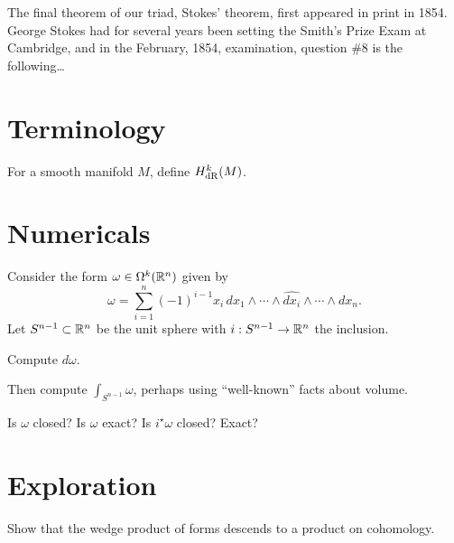 \documentclass{homework}
\author{Jim Fowler}
\begin{document}
\maketitle

\begin{inspiration} The final theorem of our triad, Stokes' theorem,
first appeared in print in 1854.  George Stokes had for several years
been setting the Smith's Prize Exam at Cambridge, and in the February,
1854, examination, question \#8 is the following\ldots {}
\end{inspiration}

\section{Terminology}

\begin{problem}
  For a smooth manifold $M$, define $H^k_{\operatorname{dR}}(M)$.
\end{problem}

\section{Numericals}

\begin{problem}
Consider the form $\omega \in \Omega^k(\mathbb{R}^n)$ given by
\[
  \omega = \sum_{i=1}^n (-1)^{i-1} x_i \, dx_1 \wedge \cdots \wedge \widehat{dx_i} \wedge \cdots \wedge dx_n.
\] Let $S^{n-1} \subset \mathbb{R}^n$ be the unit sphere with $i : S^{n-1} \to
\mathbb{R}^n$ the inclusion.

Compute $d\omega$.

Then compute $\int_{S^{n-1}} \omega$, perhaps using ``well-known''
facts about volume.
\end{problem}

\begin{problem}
 Is $\omega$ closed?  Is $\omega$ exact?  Is $i^\star \omega$ closed?  Exact?
\end{problem}

\section{Exploration}

\begin{problem} Show that the wedge product of forms descends to a
product on cohomology.
\end{problem}
\end{document}
